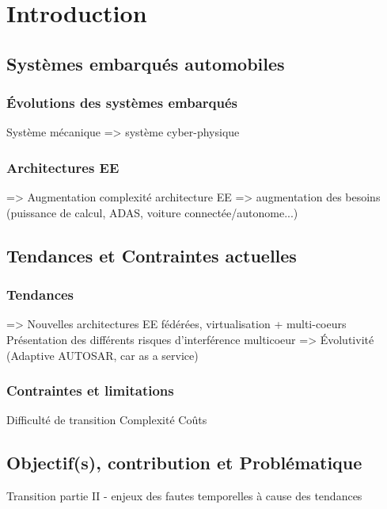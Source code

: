 \documentclass[a4paper,11pt,twoside]{StyleThese}
\begin{document}
\fi


\chapter*{Introduction}

\section{Systèmes embarqués automobiles}
    \subsection{Évolutions des systèmes embarqués}
        Système mécanique => système cyber-physique
    \subsection{Architectures EE}
        => Augmentation complexité architecture EE
        => augmentation des besoins (puissance de calcul, ADAS, voiture connectée/autonome...)
\section{Tendances et Contraintes actuelles}
    \subsection{Tendances}
        => Nouvelles architectures EE fédérées, virtualisation + multi-coeurs
            Présentation des différents risques d'interférence multicoeur
        => Évolutivité (Adaptive AUTOSAR, car as a service)
    \subsection{Contraintes et limitations}
        Difficulté de transition
        Complexité
        Coûts
\section{Objectif(s), contribution et Problématique}
    Transition partie II - enjeux des fautes temporelles à cause des tendances

\ifdefined{}
\else


\end{document}
